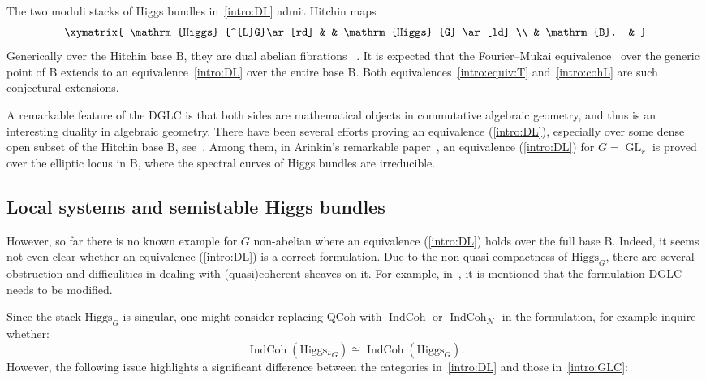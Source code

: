 \documentclass [11pt,oneside,a4paper,mathscr]{amsart}
\theoremstyle{definition}
\newcommand{\IndCoh}{\operatorname{IndCoh}}
\newcommand{\GL}{\operatorname{GL}}
\newcommand{\Hig}{\mathrm{Higgs}}
\begin{document}
The two moduli stacks of Higgs bundles in~\eqref{intro:DL} admit Hitchin maps \begin{align*} \xymatrix{ \Hig_{^{L}G}\ar[rd] & & \Hig_{G} \ar[ld] \\ & \mathrm{B}. & } \end{align*} 
Generically over the Hitchin base $\mathrm{B}$, they are dual abelian fibrations ~\cite[Theorem~A]{DoPa}.
It is expected that the Fourier–Mukai equivalence~\cite{Mu1} over the generic point of $\mathrm{B}$ extends to an equivalence~\eqref{intro:DL} over the entire base $\mathrm{B}$. Both equivalences~\eqref{intro:equiv:T} and~\eqref{intro:cohL} are such conjectural extensions.

A remarkable feature of the DGLC is that both sides 
are mathematical objects in commutative algebraic geometry, and thus is an interesting duality in algebraic geometry. 
There have been several efforts proving an equivalence (\ref{intro:DL}), especially over some 
dense open subset of the Hitchin base $\mathrm{B}$, see~\cite{Ardual, ArFe, MRVF2, MLi, PThiggs}. Among them, in Arinkin's remarkable paper~\cite{Ardual},
an equivalence (\ref{intro:DL}) for $G=\GL_r$ is proved over the elliptic locus in $\mathrm{B}$, where the spectral curves of Higgs bundles are irreducible. 




\subsection{Local systems and semistable Higgs bundles}\label{subsec:Dolb}
However, so far there is no known example for $G$ non-abelian where an equivalence (\ref{intro:DL}) holds over the full base $\mathrm{B}$. Indeed, it seems not even clear whether an equivalence (\ref{intro:DL}) is a correct formulation. Due to the non-quasi-compactness of $\Hig_G$, there 
are several obstruction and difficulities in dealing with (quasi)coherent sheaves on it. 
For example, in~\cite[Remark~1.4]{ZN}, it is mentioned that the formulation DGLC needs 
to be modified. 

Since the stack $\Hig_G$ is singular, one might consider replacing $\mathrm{QCoh}$ with $\IndCoh$ or $\IndCoh_{\mathcal{N}}$ in the formulation, for example inquire whether:
\begin{equation}\label{equiv:dolb3}
    \IndCoh(\Hig_{^LG})\cong \IndCoh(\Hig_{G}).
\end{equation}
However, the following issue highlights a significant difference between the categories in~\eqref{intro:DL} and those in~\eqref{intro:GLC}:
\end{document}
